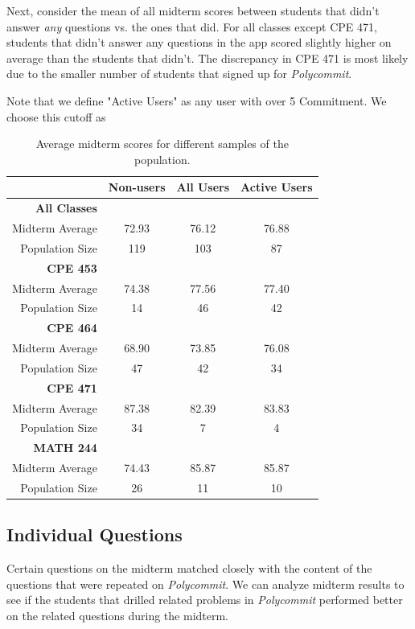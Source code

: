  \par Next, consider the mean of all midterm scores between students that didn't answer \textit{any} questions vs. the ones that did. For all classes except CPE 471, students that didn't answer any questions in the app scored slightly higher on average than the students that didn't. The discrepancy in CPE 471 is most likely due to the smaller number of students that signed up for \textit{Polycommit}.
 
 \par Note that we define "Active Users" as any user with over 5 Commitment. We choose this cutoff as 
  
  \begin{table}
 \begin{tabular}[h]{ r c c c}
  & \textbf{Non-users} & \textbf{All Users} & \textbf{Active Users} \\
  \hline
  \textbf{All Classes} & & & \\
  Midterm Average & 72.93 & 76.12 & 76.88 \\
  Population Size & 119 & 103 & 87 \\
  \hline
  \textbf{CPE 453} & & & \\
 Midterm Average & 74.38 & 77.56 & 77.40 \\
 Population Size & 14 & 46 & 42 \\
 \hline
 \textbf{CPE 464} & & & \\
 Midterm Average & 68.90 & 73.85 & 76.08 \\
 Population Size & 47 & 42 & 34 \\
 \hline
 \textbf{CPE 471} & & & \\
 Midterm Average & 87.38 & 82.39 & 83.83 \\
 Population Size & 34 & 7 & 4 \\
 \hline
 \textbf{MATH 244} & & & \\
 Midterm Average & 74.43 & 85.87 & 85.87 \\
 Population Size & 26 & 11 & 10 \\
 
\end{tabular}
\caption{Average midterm scores for different samples of the population. }
\end{table}

\subsection{Individual Questions}
Certain questions on the midterm matched closely with the content of the questions that were repeated on \textit{Polycommit}. We can analyze midterm results to see if the students that drilled related problems in \textit{Polycommit} performed better on the related questions during the midterm.

